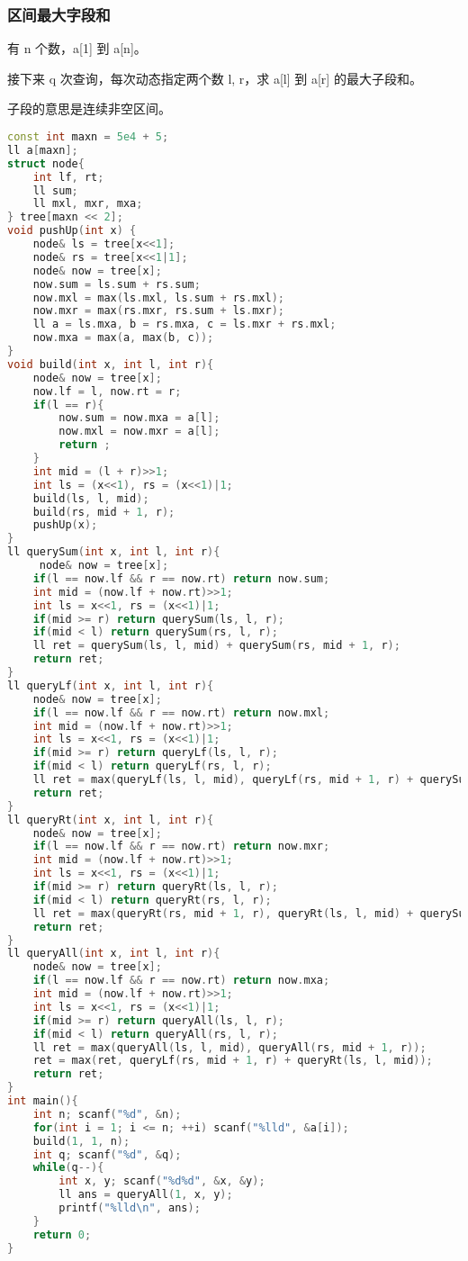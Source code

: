\subsubsection{区间最大字段和}

有 n 个数，a[1] 到 a[n]。

接下来 q 次查询，每次动态指定两个数 l, r，求 a[l] 到 a[r] 的最大子段和。

子段的意思是连续非空区间。

\begin{lstlisting}[language=C++]
const int maxn = 5e4 + 5;
ll a[maxn];
struct node{
    int lf, rt;
    ll sum;
    ll mxl, mxr, mxa;
} tree[maxn << 2];
void pushUp(int x) {
    node& ls = tree[x<<1];
    node& rs = tree[x<<1|1];
    node& now = tree[x];
    now.sum = ls.sum + rs.sum;
    now.mxl = max(ls.mxl, ls.sum + rs.mxl);
    now.mxr = max(rs.mxr, rs.sum + ls.mxr);
    ll a = ls.mxa, b = rs.mxa, c = ls.mxr + rs.mxl;
    now.mxa = max(a, max(b, c));
}
void build(int x, int l, int r){
    node& now = tree[x];
    now.lf = l, now.rt = r;
    if(l == r){
        now.sum = now.mxa = a[l];
        now.mxl = now.mxr = a[l];
        return ;
    }
    int mid = (l + r)>>1;
    int ls = (x<<1), rs = (x<<1)|1;
    build(ls, l, mid);
    build(rs, mid + 1, r);
    pushUp(x);
}
ll querySum(int x, int l, int r){
     node& now = tree[x];
    if(l == now.lf && r == now.rt) return now.sum;
    int mid = (now.lf + now.rt)>>1;
    int ls = x<<1, rs = (x<<1)|1;
    if(mid >= r) return querySum(ls, l, r);
    if(mid < l) return querySum(rs, l, r);
    ll ret = querySum(ls, l, mid) + querySum(rs, mid + 1, r);
    return ret;
}
ll queryLf(int x, int l, int r){
    node& now = tree[x];
    if(l == now.lf && r == now.rt) return now.mxl;
    int mid = (now.lf + now.rt)>>1;
    int ls = x<<1, rs = (x<<1)|1;
    if(mid >= r) return queryLf(ls, l, r);
    if(mid < l) return queryLf(rs, l, r);
    ll ret = max(queryLf(ls, l, mid), queryLf(rs, mid + 1, r) + querySum(ls, l, mid));
    return ret;
}
ll queryRt(int x, int l, int r){
    node& now = tree[x];
    if(l == now.lf && r == now.rt) return now.mxr;
    int mid = (now.lf + now.rt)>>1;
    int ls = x<<1, rs = (x<<1)|1;
    if(mid >= r) return queryRt(ls, l, r);
    if(mid < l) return queryRt(rs, l, r);
    ll ret = max(queryRt(rs, mid + 1, r), queryRt(ls, l, mid) + querySum(rs, mid + 1, r));
    return ret;
}
ll queryAll(int x, int l, int r){
    node& now = tree[x];
    if(l == now.lf && r == now.rt) return now.mxa;
    int mid = (now.lf + now.rt)>>1;
    int ls = x<<1, rs = (x<<1)|1;
    if(mid >= r) return queryAll(ls, l, r);
    if(mid < l) return queryAll(rs, l, r);
    ll ret = max(queryAll(ls, l, mid), queryAll(rs, mid + 1, r));
    ret = max(ret, queryLf(rs, mid + 1, r) + queryRt(ls, l, mid));
    return ret;
}
int main(){
    int n; scanf("%d", &n);
    for(int i = 1; i <= n; ++i) scanf("%lld", &a[i]);
    build(1, 1, n);
    int q; scanf("%d", &q);
    while(q--){
        int x, y; scanf("%d%d", &x, &y);
        ll ans = queryAll(1, x, y);
        printf("%lld\n", ans);
    }
    return 0;
}
\end{lstlisting}

